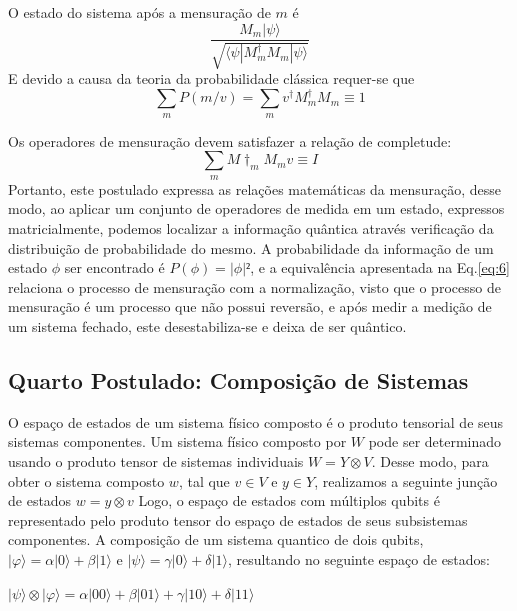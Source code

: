 \documentclass[tcc,capa]{texufpel}
\begin{document}
O estado do sistema após a mensuração de $m$ é
\begin{equation}
    \frac{M_m|\psi\rangle}{\sqrt{\langle\psi|M^\dagger_mM_m|\psi\rangle}}
\end{equation}
E devido a causa da teoria da probabilidade clássica requer-se que
\begin{equation}
    \sum\limits_{m}P(m/v) = \sum\limits_{m}v^\dagger M^\dagger_mM_m\equiv 1
\end{equation}

Os operadores de mensuração devem satisfazer a relação de completude:
\begin{equation}\label{eq:6}
    \sum\limits_{m}M\dagger_mM_mv\equiv I
\end{equation}
Portanto, este postulado expressa as relações matemáticas da mensuração, desse modo, ao aplicar um conjunto de operadores de medida em um estado, expressos matricialmente, podemos localizar a informação quântica através verificação da distribuição de probabilidade do mesmo. A probabilidade da informação de um estado $\phi$ ser encontrado é $P(\phi)=|\phi|²$, e a equivalência apresentada na Eq.\ref{eq:6} relaciona o processo de mensuração com a normalização, visto que o processo de mensuração é um processo que não possui reversão, e após medir a medição de um sistema fechado, este desestabiliza-se e deixa de ser quântico.

\subsection{Quarto Postulado: Composição de Sistemas}
O espaço de estados de um sistema físico composto é o produto tensorial de seus sistemas componentes. Um sistema físico composto por $W$ pode ser determinado usando o produto tensor de sistemas individuais $W= Y \otimes V$. Desse modo, para obter o sistema composto $w$, tal que $v \in V$ e $y \in Y$, realizamos a seguinte junção de estados $w= y \otimes v$ \cite{imre2005quantum}
Logo, o espaço de estados com múltiplos qubits é representado pelo produto tensor do espaço de estados de seus subsistemas componentes. A composição de um sistema quantico de dois qubits, $|\varphi\rangle= \alpha|0\rangle + \beta|1\rangle$ e $|\psi\rangle= \gamma|0\rangle + \delta|1\rangle$, resultando no seguinte espaço de estados:

 \begin{center} 
 $|\psi\rangle \otimes |\varphi\rangle= \alpha|00\rangle + \beta|01\rangle + \gamma|10\rangle + \delta|11\rangle $
 \end{center}
\end{document}
